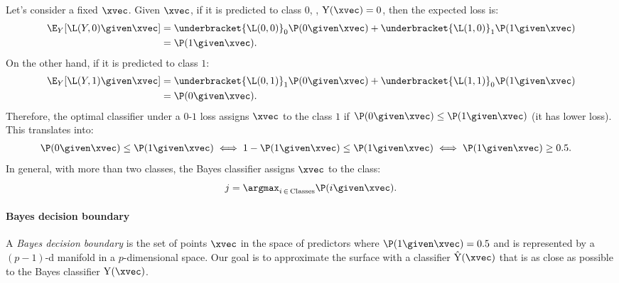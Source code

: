 Let's consider a fixed $\xvec$. Given $\xvec$, if it is predicted to class $0$, \ie, $\operatorname{Y}(\xvec) = 0$, then the expected loss is:
\begin{equation}
    \begin{aligned}
        \E_Y[\L(Y\negthinspace, 0) \given \xvec] & = \underbracket{\L(0,0)}_0\P(0 \given \xvec) + \underbracket{\L(1,0)}_1\P(1 \given \xvec) \\
                                                & = \P(1 \given \xvec).
    \end{aligned}
\end{equation}
On the other hand, if it is predicted to class $1$:
\begin{equation}
    \begin{aligned}
        \E_Y[\L(Y\negthinspace, 1) \given \xvec] & = \underbracket{\L(0,1)}_1\P(0 \given \xvec) + \underbracket{\L(1,1)}_0\P(1 \given \xvec) \\
                                                & = \P(0 \given \xvec).
    \end{aligned}
\end{equation}
Therefore, the optimal classifier under a $0$-$1$ loss assigns $\xvec$ to the class $1$ if $\P(0 \given \xvec) \leq \P(1 \given \xvec)$ (it has lower loss). This translates into:
\begin{equation}
    \begin{aligned}
        \P(0 \given \xvec) & \leq \P(1 \given \xvec) \iff 1 - \P(1 \given \xvec) \leq \P(1 \given \xvec) \iff \P(1 \given \xvec) \geq 0.5.
    \end{aligned}
\end{equation}
In general, with more than two classes, the Bayes classifier assigns $\xvec$ to the class:
\begin{equation}
    j = \argmax_{i\,\in\,\text{Classes}}\P(i\given \xvec).
\end{equation}

\paragraph{Bayes decision boundary}

A \emph{Bayes decision boundary} is the set of points $\xvec$ in the space of predictors where $\P(1 \given \xvec) = 0.5$ and is represented by a $(p-1)$-d manifold in a $p$-dimensional space. Our goal is to approximate the surface with a classifier $\hat{\operatorname{Y}}(\xvec)$ that is as close as possible to the Bayes classifier $\operatorname{Y}(\xvec)$.

